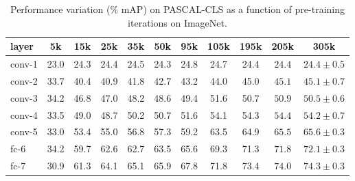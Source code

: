 \setlength{\tabcolsep}{4pt}
\begin{table}[t!]
\begin{center}
\caption{Performance variation (\% mAP) on PASCAL-CLS as a function of pre-training iterations on ImageNet.}
\label{table:det-traj-classify}
\vspace{0.3em}
\begin{tabular}{lcccccccccc}
layer  & 5k & 15k & 25k & 35k & 50k & 95k & 105k & 195k & 205k & 305k \\
\hline
conv-1 & 23.0 & 24.3 & 24.4 & 24.5 & 24.3 & 24.8 & 24.7 & 24.4 & $24.4$  & $24.4 \pm 0.5$ \\
conv-2 & 33.7 & 40.4 & 40.9 & 41.8 & 42.7 & 43.2 & 44.0 & 45.0 & $45.1$  & $45.1 \pm 0.7$ \\
conv-3 & 34.2 & 46.8 & 47.0 & 48.2 & 48.6 & 49.4 & 51.6 & 50.7 & $50.9$  & $50.5 \pm 0.6$ \\
conv-4 & 33.5 & 49.0 & 48.7 & 50.2 & 50.7 & 51.6 & 54.1 & 54.3 & $54.4$  & $54.2 \pm 0.7$ \\
conv-5 & 33.0 & 53.4 & 55.0 & 56.8 & 57.3 & 59.2 & 63.5 & 64.9 & $65.5$  & $65.6 \pm 0.3 $ \\
fc-6   & 34.2 & 59.7 & 62.6 & 62.7 & 63.5 & 65.6 & 69.3 & 71.3 & $71.8$  & $72.1 \pm 0.3 $\\
fc-7   & 30.9 & 61.3 & 64.1 & 65.1 & 65.9 & 67.8 & 71.8 & 73.4 & $74.0$  & $74.3 \pm 0.3 $\\
\end{tabular}
\end{center}
\end{table}
\setlength{\tabcolsep}{1.4pt}

\setlength{\tabcolsep}{4pt}
\begin{table}[t!]
\begin{center}
\caption{Performance variation on SUN-CLS and PASCAL-DET using features from a CNN pre-trained for different number of iterations and fine-tuned for a fixed number of iterations (40k for SUN-CLS and 70k for PASCAL-DET)}
\label{table:det-trajectory}
\vspace{0.3em}
\end{center}
\end{table}
\setlength{\tabcolsep}{1.4pt}


